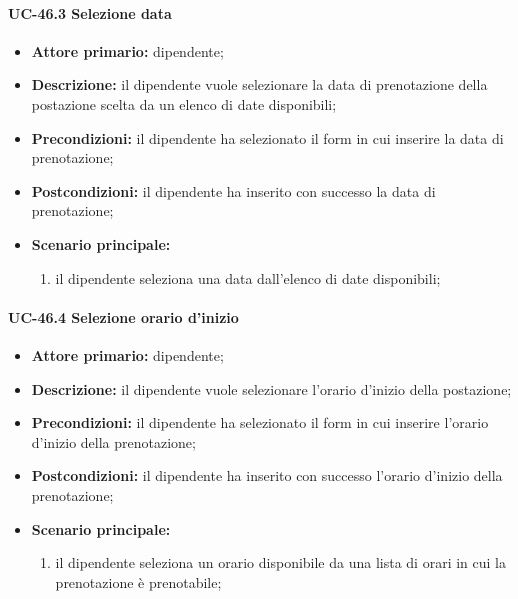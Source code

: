 \paragraph{UC-46.3 Selezione data}

    \begin{itemize}
        \item \textbf{Attore primario:} dipendente;

        \item \textbf{Descrizione:} il dipendente vuole selezionare la data di prenotazione della postazione scelta da un elenco di date disponibili;

        \item \textbf{Precondizioni:} il dipendente ha selezionato il form in cui inserire la data di prenotazione;

        \item \textbf{Postcondizioni:} il dipendente ha inserito con successo la data di prenotazione;

        \item \textbf{Scenario principale:}
            \begin{enumerate}
                \item il dipendente seleziona una data dall'elenco di date disponibili;
            \end{enumerate}
    \end{itemize}


\paragraph{UC-46.4 Selezione orario d'inizio}

    \begin{itemize}
        \item \textbf{Attore primario:} dipendente;

        \item \textbf{Descrizione:} il dipendente vuole selezionare l'orario d'inizio della postazione;

        \item \textbf{Precondizioni:} il dipendente ha selezionato il form in cui inserire l'orario d'inizio della prenotazione;

        \item \textbf{Postcondizioni:} il dipendente ha inserito con successo l'orario d'inizio della prenotazione;

        \item \textbf{Scenario principale:}
            \begin{enumerate}
                \item il dipendente seleziona un orario disponibile da una lista di orari in cui la prenotazione è prenotabile;
            \end{enumerate}
    \end{itemize}

